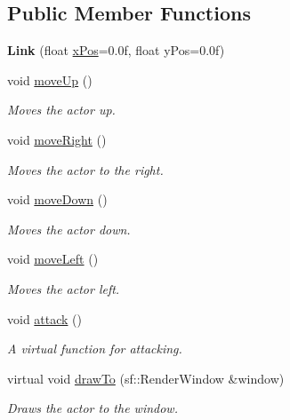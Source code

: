 \subsection*{Public Member Functions}
\begin{DoxyCompactItemize}
\item 
\mbox{\label{classLink_ab709f50a45a23296e9e78baf5bb75c67}} 
{\bfseries Link} (float \mbox{\hyperlink{classActor_ab460c32c344963afcf476926367bd794}{x\+Pos}}=0.\+0f, float y\+Pos=0.\+0f)
\item 
void \mbox{\hyperlink{classLink_a850a1e6c7a68d921b36d30dc918a7668}{move\+Up}} ()
\begin{DoxyCompactList}\small\item\em Moves the actor up. \end{DoxyCompactList}\item 
void \mbox{\hyperlink{classLink_aa1d60136a88be20a14179a5760ed91da}{move\+Right}} ()
\begin{DoxyCompactList}\small\item\em Moves the actor to the right. \end{DoxyCompactList}\item 
void \mbox{\hyperlink{classLink_a9ff8ec271a0119f6e1ee178afb47f323}{move\+Down}} ()
\begin{DoxyCompactList}\small\item\em Moves the actor down. \end{DoxyCompactList}\item 
void \mbox{\hyperlink{classLink_a682bab2dc3f967e35a67dcc74c1d4722}{move\+Left}} ()
\begin{DoxyCompactList}\small\item\em Moves the actor left. \end{DoxyCompactList}\item 
void \mbox{\hyperlink{classLink_a0d56dc31b6bf76258f50a393e92f46c4}{attack}} ()
\begin{DoxyCompactList}\small\item\em A virtual function for attacking. \end{DoxyCompactList}\item 
virtual void \mbox{\hyperlink{classLink_ac91a924fdf779fa02d477b7f60dbdc1e}{draw\+To}} (sf\+::\+Render\+Window \&window)
\begin{DoxyCompactList}\small\item\em Draws the actor to the window. \end{DoxyCompactList}\end{DoxyCompactItemize}

